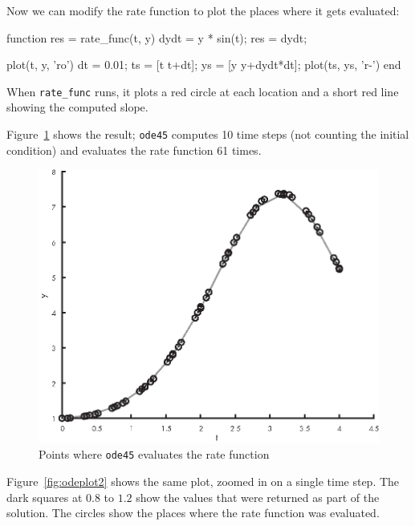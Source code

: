 
Now we can modify the rate function to plot the places where it gets evaluated:

\begin{code}
function res = rate_func(t, y)
    dydt = y * sin(t);
    res = dydt;

    plot(t, y, 'ro')
    dt = 0.01;
    ts = [t t+dt];
    ys = [y y+dydt*dt];
    plot(ts, ys, 'r-')
end
\end{code}

When \lstinline{rate_func} runs, it plots a red circle at each location and a short red line showing the computed slope.


Figure~\ref{fig:odeplot1} shows the result;  \lstinline{ode45} computes 10 time steps (not counting the initial condition) and evaluates the rate function 61 times.

\begin{figure}[h]
\centerline{\includegraphics[scale=0.8]{images/figure15_01_new.eps}}
\caption{Points where \lstinline{ode45} evaluates the rate function}
\label{fig:odeplot1}
\end{figure}

Figure~\ref{fig:odeplot2} shows the same plot, zoomed in on a single time step.
The dark squares at $0.8$ to $1.2$ show the values that were returned as part of the solution.
The circles show the places where the rate function was evaluated.

